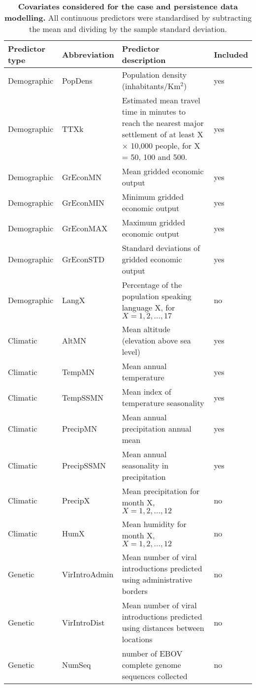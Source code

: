 \begin{minipage}{\textwidth}  
\setcounter{mpfootnote}{\value{footnote}}
\renewcommand{\thempfootnote}{\arabic{mpfootnote}}
\fontsize{9}{11}\selectfont
\begin{longtable}{ | l | l | p{} | l | }
\caption[Covariates considered for the case and persistence data modelling.]{\textbf{Covariates considered for the case and persistence data modelling.} All continuous predictors were standardised by subtracting the mean and dividing by the sample standard deviation.}
\label{tab:predictorTable}\\
\hline
Predictor type & Abbreviation & Predictor description & Included\footnotemark[1]\\
\hline
Demographic & PopDens & Population density (inhabitants/Km$^2$) & yes\\ 
\hline
Demographic & TTXk & Estimated mean travel time in minutes to reach the nearest major settlement of at least X $\times$ 10,000 people, for X = 50, 100 and 500. & yes\\ 
\hline
Demographic & GrEconMN & Mean gridded economic output & yes\\ 
\hline
Demographic & GrEconMIN & Minimum gridded economic output & yes\\ 
\hline
Demographic & GrEconMAX & Maximum gridded economic output & yes\\ 
\hline
Demographic & GrEconSTD & Standard deviations of gridded economic output & yes \\ 
\hline
Demographic & LangX & Percentage of the population speaking language X, for $X = 1, 2, \ldots, 17$ & no\\ 
\hline
Climatic & AltMN & Mean altitude (elevation above sea level)& yes\\ 
\hline
Climatic & TempMN & Mean annual temperature & yes \\ 
\hline
Climatic & TempSSMN & Mean index of temperature seasonality & yes\\ 
\hline
Climatic & PrecipMN & Mean annual precipitation annual mean & yes\\ 
\hline
Climatic & PrecipSSMN & Mean annual seasonality in precipitation & yes\\ 
\hline
Climatic & PrecipX & Mean precipitation for month X, $X = 1, 2, \ldots, 12$ & no\\ 
\hline
Climatic & HumX & Mean humidity for month X, $X = 1, 2, \ldots, 12$ & no\\ 
\hline
Genetic & VirIntroAdmin & Mean number of viral introductions predicted using administrative borders & no\\ 
\hline
Genetic & VirIntroDist & Mean number of viral introductions predicted using distances between locations & no\\ 
\hline
Genetic & NumSeq & number of EBOV complete genome sequences collected & no\\ 
\hline
\end{longtable}
\setcounter{footnote}{\value{mpfootnote}}
\end{minipage}

